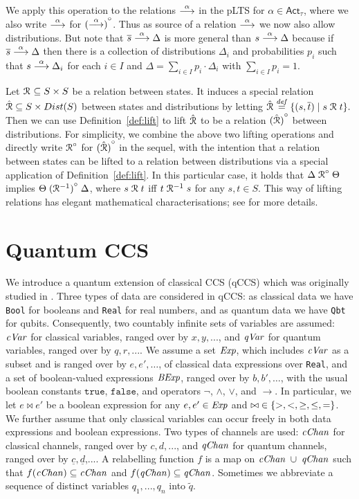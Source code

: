 \documentclass[a4paper,UKenglish,cleveref, autoref]{lipics-v2019}
\def\ra{\ensuremath{\rightarrow}}
\newcommand{\define}{\stackrel{\it def}=}
\newcommand{\dist}[1]{\mathop{Dist} ({#1})   } %
\newcommand{\pdist}[1]{\overline{#1}  } %
\newcommand{\lift}[1]{\mathrel{{#1}^\circ}}
\newcommand{\Act}{\ensuremath{\mathsf{Act}}\xspace}
\newcommand{\qc}{\underline{c}}
\newcommand{\qd}{\underline{d}}
\newcommand{\cVar}{{\it cVar}}
\newcommand{\qVar}{{\it qVar}}
\newcommand{\cChan}{{\it cChan}}
\newcommand{\qChan}{{\it qChan}}
\begin{document}
We apply this operation to the relations  $\mathrel{\stackrel{\alpha}{\longrightarrow}}$ in the pLTS
for $\alpha\in \Act_{\tau}$, where we also write $\mathrel{\stackrel{\alpha}{\longrightarrow}}$ for
$\lift{(\ar{\alpha})}$. Thus as source of
a relation $\mathrel{\stackrel{\alpha}{\longrightarrow}}$ we now also allow distributions.
But note that  $\pdist{s} \ar{\alpha} \Delta$ is more general than
$s \mathrel{\stackrel{\alpha}{\longrightarrow}} \Delta$ because if
$\pdist{s}\ar{\alpha}\Delta$ then there is a collection of distributions
$\Delta_i$ and probabilities $p_i$ such that $s\mathrel{\stackrel{\alpha}{\longrightarrow}}\Delta_i$ for each $i\in I$ and
$\Delta=\sum_{i\in I}p_i\cdot\Delta_i$ with $\sum_{i\in I}p_i=1$.

Let $\mathrel{{\mathcal R }}\ \subseteq S \times S$ be a relation between states. It induces a special relation $\hat{\aRel}\subseteq S\times\dist{S}$ between states and distributions by letting
$\hat{\aRel} \define \sset{(s,\pdist{t})\mid s\aRel t}.$
Then we can use Definition~\ref{def:lift} to lift $\hat{\mathrel{{\mathcal R }}}$ to be a relation $\lift{(\hat{\aRel})}$ between distributions. For simplicity, we combine the above two lifting operations and directly write $\lift{\aRel}$ for $\lift{(\hat{\aRel})}$ in the sequel, with the intention that a relation between states can be lifted to a relation between distributions via a special application of Definition~\ref{def:lift}. In this particular case, it holds that $\Delta \lift{\aRel} \Theta$ implies $\Theta \lift{(\aRel^{-1})}\Delta$, where $s \mathrel{{\mathcal R }} t$ iff $t\mathrel{{\mathcal R }}^{-1} s$ for any $s,t\in S$. This way of lifting relations has elegant mathematical characterisations; see \cite{DD11} for more details.


\section{Quantum CCS}\label{sec:qccs}

We introduce a quantum extension of classical CCS (qCCS) which was originally studied in \cite{FDJY07,YFDJ09,FDY11}. Three types of data are considered in qCCS: as classical data we have \texttt{Bool} for booleans and \texttt{Real} for real numbers, and as quantum data we have \texttt{Qbt} for qubits. Consequently,
two countably infinite sets of variables are assumed: $\cVar$ for classical variables, ranged over by $x,y,...$, and $\qVar$ for quantum variables, ranged over by $q,r,...$.
We assume a set ${\it Exp}$, which includes $\cVar$ as a subset and is ranged over by $e,e',\dots$,  of classical data expressions over
\texttt{Real}, and a set of boolean-valued expressions ${\it BExp}$, ranged over by $b, b',\dots$, with the usual  boolean constants $\texttt{true}$, $\texttt{false}$, and operators
$\neg$, $\wedge$, $\vee$, and $\ra$. In particular, we let $e\bowtie e'$ be a boolean expression for any $e,e'\in {\it Exp}$ and ${\bowtie} \in\{ {>, <, \geq, \leq, =} \}$.
We further assume that only classical variables can occur freely in both data expressions and boolean expressions.
Two types of channels are used: $\cChan$ for classical channels, ranged over by $c,d,...$, and $\qChan$ for quantum channels, ranged over by $\qc,\qd$,.... A relabelling function $f$ is a map on $\cChan\; \cup\; \qChan$ such that $f(\cChan)\subseteq \cChan$ and $f(\qChan)\subseteq \qChan$.
Sometimes we abbreviate a sequence of distinct variables $q_1,...,q_n$ into $\tilde{q}$.
\end{document}
